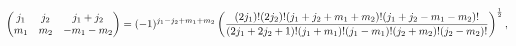 \[\begin{pmatrix}j_{1}&j_{2}&j_{1}+j_{2}\\
m_{1}&m_{2}&-m_{1}-m_{2}\end{pmatrix}=(-1)^{j_{1}-j_{2}+m_{1}+m_{2}}\left(%
\frac{(2j_{1})!(2j_{2})!(j_{1}+j_{2}+m_{1}+m_{2})!(j_{1}+j_{2}-m_{1}-m_{2})!}{%
(2j_{1}+2j_{2}+1)!(j_{1}+m_{1})!(j_{1}-m_{1})!(j_{2}+m_{2})!(j_{2}-m_{2})!}%
\right)^{\frac{1}{2}},\]